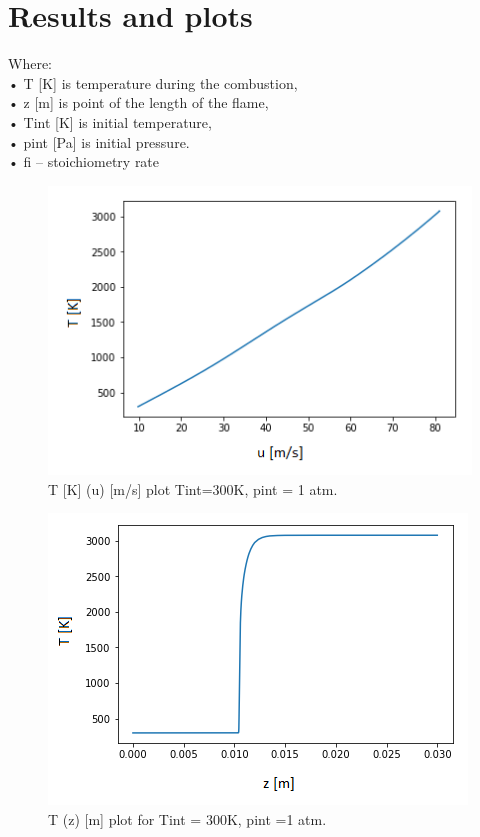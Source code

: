 \documentclass[11pt]{article}
\begin{document}
\section{Results and plots}
Where:\\
[2mm]
•	T [K] is temperature during the combustion,\\
[2mm]
•	z [m] is point of the length of the flame,\\
[2mm]
•	Tint [K] is initial temperature,\\
[2mm]
•	pint [Pa] is initial pressure.\\
[2mm]
•	fi – stoichiometry rate
\begin{figure} [H]
	\begin{center}
\includegraphics[height=0.5\textwidth]{P1}
        \caption{T [K] (u) [m/s] plot Tint=300K, pint = 1 atm.}
    \end{center}
\end{figure}

\begin{figure} [H]
	\begin{center}
    \includegraphics[height=0.5\textwidth]{P2}
        \caption{T (z) [m] plot for Tint = 300K, pint =1 atm.}
    \end{center}
\end{figure}
\end{document}
